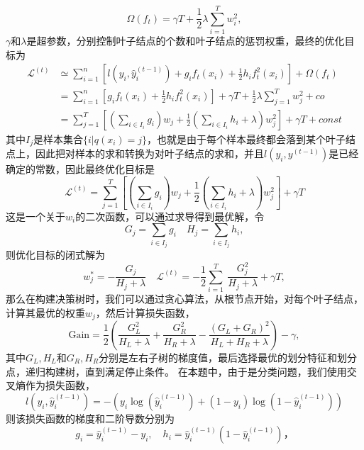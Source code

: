 \begin{equation}
	\Omega(f_t)=\gamma T+\frac{1}{2}\lambda\sum_{i=1}^{T}w_i^2,
\end{equation}
$\gamma$和$\lambda$是超参数，分别控制叶子结点的个数和叶子结点的惩罚权重，最终的优化目标为
\begin{equation}
	\begin{aligned}
		\mathcal{L}^{(t)} & \simeq\sum_{i=1}^{n}\left[l\left(y_{i},\hat{y}_{i}^{(t-1)}\right)+g_{i}f_{t}(x_{i})+\frac{1}{2}h_{i}f_{t}^{2}(x_{i})\right]+\Omega(f_{t})
		\\
		                  & =\sum_{i=1}^{n}\left[g_{i}f_{t}(x_{i})+\frac{1}{2}h_{i}f_{t}^{2}(x_{i})\right]+\gamma T+\frac{1}{2}\lambda\sum_{j=1}^{T}w_{j}^{2}+co
		\\
		                  & =\sum_{j=1}^{T}\left[(\sum_{i\in I_{i}}g_{i})w_{j}+\frac{1}{2}(\sum_{i\in I_{i}}h_{i}+\lambda)w_{j}^{2}\right]+\gamma T+const
	\end{aligned}
\end{equation}
其中$I_j$是样本集合$\{i|q(x_i)=j\}$，也就是由于每个样本最终都会落到某个叶子结点上，因此把对样本的求和转换为对叶子结点的求和，并且$l(y_i,y^{(t-1)})$是已经确定的常数，因此最终优化目标是
\begin{equation}
	\mathcal{L}^{(t)}=\sum_{j=1}^{T}\left[(\sum_{i\in I_{i}}g_{i})w_{j}+\frac{1}{2}(\sum_{i\in I_{i}}h_{i}+\lambda)w_{j}^{2}\right]+\gamma T
\end{equation}
这是一个关于$w_i$的二次函数，可以通过求导得到最优解，令
\begin{equation}
	G_j=\sum_{i \in I_j}g_i\quad H_j=\sum_{i \in I_j}h_i,
\end{equation}
则优化目标的闭式解为
\begin{equation}
	w_{j}^{*}=-\frac{G_{j}}{H_{j}+\lambda}\quad \mathcal{L}^{(t)}=-\frac{1}{2}\sum_{i=1}^{T}\:\frac{G_{j}^{2}}{H_{j}+\lambda}+\gamma T,
\end{equation}
那么在构建决策树时，我们可以通过贪心算法，从根节点开始，对每个叶子结点，计算其最优的权重$w_j$，然后计算损失函数，
\begin{equation}
	\text{Gain}=\frac{1}{2}(\frac{G_{L}^{2}}{H_{L}+\lambda}+\frac{G_{R}^{2}}{H_{R}+\lambda}-\frac{(G_{L}+G_{R})^{2}}{H_{L}+H_{R}+\lambda})-\gamma,
\end{equation}
其中$G_L,H_L$和$G_R,H_R$分别是左右子树的梯度值，最后选择最优的划分特征和划分点，递归构建树，直到满足停止条件。
在本题中，由于是分类问题，我们使用交叉熵作为损失函数，
\begin{equation}
	l(y_i,\hat{y}_i^{(t-1)})=-\left(y_i\log(\hat{y}_i^{(t-1)})+(1-y_i)\log(1-\hat{y}_i^{(t-1)})\right)
\end{equation}
则该损失函数的梯度和二阶导数分别为
\begin{equation}
	g_i=\hat{y}_i^{(t-1)}-y_i ,\quad h_i=\hat{y}_i^{(t-1)}(1-\hat{y}_i^{(t-1)})，
\end{equation}

